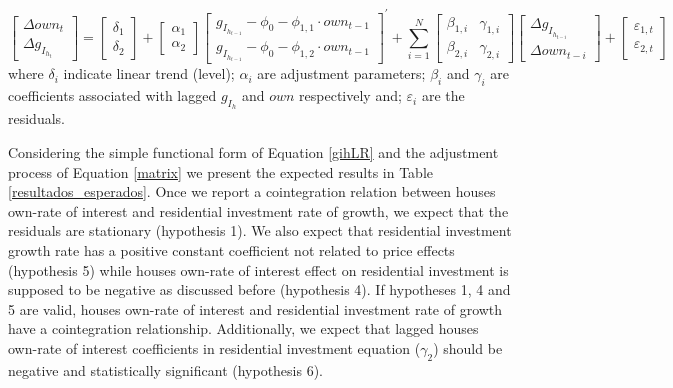 \documentclass[12pt, a4paper]{article}
\begin{document}
\begin{equation}
\label{matrix}
\begin{bmatrix}
\Delta own_{t}\\
\Delta g_{I_{h_{t}}}
\end{bmatrix} = \begin{bmatrix}\delta_{1}\\ \delta_{2}\end{bmatrix} + \begin{bmatrix}\alpha_{1}\\ \alpha_{2}\end{bmatrix} \begin{bmatrix}g_{I_{h_{t-1}}} - \phi_{0} - \phi_{1,1}\cdot own_{t-1}\\g_{I_{h_{t-1}}} - \phi_{0} - \phi_{1,2}\cdot own_{t-1}\end{bmatrix}^{\prime} + \sum^N_{i=1} \begin{bmatrix}\beta_{1,i} & \gamma_{1,i} \\\beta_{2,i} & \gamma_{2,i} \end{bmatrix} \begin{bmatrix}\Delta g_{I_{h_{t-i}}} \\\Delta own_{t-i}\end{bmatrix} + \begin{bmatrix}\varepsilon_{1,t}\\\varepsilon_{2,t}\end{bmatrix}
\end{equation}
where \(\delta_{i}\) indicate linear trend (level);
\(\alpha_{i}\) are adjustment parameters;
\(\beta_{i}\) and \(\gamma_{i}\) are coefficients associated with lagged \(g_{I_h}\) and \(own\) respectively and; \(\varepsilon_{i}\) are the residuals.

Considering the simple functional form of Equation \ref{gihLR} and the adjustment process of Equation \ref{matrix} we present the expected results in Table \ref{resultados_esperados}.
Once we report a cointegration relation between houses own-rate of interest and residential investment rate of growth, we expect that the residuals are stationary (hypothesis 1).
We also expect that residential investment growth rate has a positive constant coefficient not related to price effects (hypothesis 5) while houses own-rate of interest effect on residential investment is supposed to be negative as discussed before (hypothesis 4).
If  hypotheses 1, 4 and 5 are valid, houses own-rate of interest and residential investment rate of growth have a cointegration relationship.
Additionally, we expect that lagged houses own-rate of interest coefficients in residential investment equation (\(\gamma_{2}\)) should be negative and statistically significant (hypothesis 6).
\end{document}
